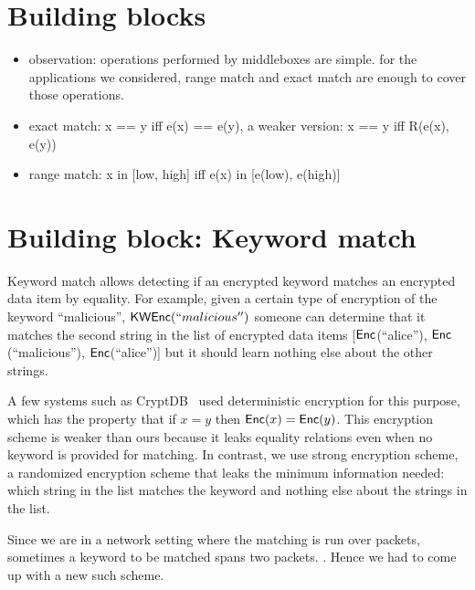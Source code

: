 
\section{Building blocks}\label{sec:blocks}


\begin{itemize}
\item observation: operations performed by middleboxes are simple. for the applications we considered, range match and exact match are enough to cover those operations.
\item exact match: x == y iff e(x) == e(y), a weaker version: x == y iff R(e(x), e(y))
\item range match: x in [low, high] iff e(x) in [e(low), e(high)]

\end{itemize}


\section{Building block: Keyword match}




Keyword match allows detecting if an encrypted keyword matches an encrypted data item by equality.
For example, given a certain type of encryption of the keyword ``malicious'', $\mathsf{KWEnc}(``malicious'')$ someone can determine that it matches the second string in the list of encrypted data items [$\mathsf{Enc}$(``alice''), $\mathsf{Enc}$(``malicious''), $\mathsf{Enc}$(``alice'')] but it should learn nothing else about the other strings.

A few systems such as CryptDB~\cite{cryptdb, someother} used deterministic encryption for this purpose, which has the property that if $x = y$ then $\mathsf{Enc}(x) = \mathsf{Enc}(y)$. This encryption scheme is weaker than ours because it leaks equality relations even when no keyword is provided for matching. In contrast, we use strong encryption scheme, a randomized encryption scheme that leaks the minimum information needed: which string in the list matches the keyword and nothing else about the strings in the list. 

Since we are in a network setting where the matching is run over packets, sometimes a keyword to be matched spans two packets. . Hence we had to come up with a new such scheme. 

